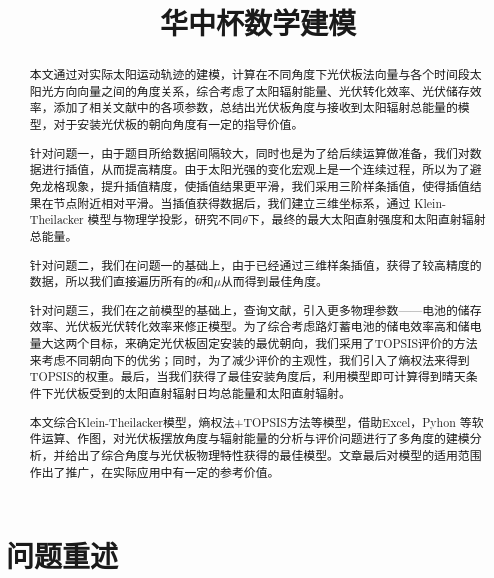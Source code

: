 \documentclass[withoutpreface,bwprint]{cumcmthesis} %
\title{华中杯数学建模}
\begin{document}
	
 \maketitle


 \begin{abstract}

本文通过对实际太阳运动轨迹的建模，计算在不同角度下光伏板法向量与各个时间段太阳光方向向量之间的角度关系，综合考虑了太阳辐射能量、光伏转化效率、光伏储存效率，添加了相关文献中的各项参数，总结出光伏板角度与接收到太阳辐射总能量的模型，对于安装光伏板的朝向角度有一定的指导价值。

针对问题一，由于题目所给数据间隔较大，同时也是为了给后续运算做准备，我们对数据进行插值，从而提高精度。由于太阳光强的变化宏观上是一个连续过程，所以为了避免龙格现象，提升插值精度，使插值结果更平滑，我们采用三阶样条插值，使得插值结果在节点附近相对平滑。当插值获得数据后，我们建立三维坐标系，通过 Klein-Theilacker 模型与物理学投影，研究不同$\theta$下，最终的最大太阳直射强度和太阳直射辐射总能量。

针对问题二，我们在问题一的基础上，由于已经通过三维样条插值，获得了较高精度的数据，所以我们直接遍历所有的$\theta$和$\mu$从而得到最佳角度。

针对问题三，我们在之前模型的基础上，查询文献，引入更多物理参数——电池的储存效率、光伏板光伏转化效率来修正模型。为了综合考虑路灯蓄电池的储电效率高和储电量大这两个目标，来确定光伏板固定安装的最优朝向，我们采用了TOPSIS评价的方法来考虑不同朝向下的优劣；同时，为了减少评价的主观性，我们引入了熵权法来得到TOPSIS的权重。最后，当我们获得了最佳安装角度后，利用模型即可计算得到晴天条件下光伏板受到的太阳直射辐射日均总能量和太阳直射辐射。

本文综合Klein-Theilacker模型，熵权法+TOPSIS方法等模型，借助Excel，Pyhon 等软件运算、作图，对光伏板摆放角度与辐射能量的分析与评价问题进行了多角度的建模分析，并给出了综合角度与光伏板物理特性获得的最佳模型。文章最后对模型的适用范围作出了推广，在实际应用中有一定的参考价值。


\end{abstract}



\tableofcontents

\newpage


\section{问题重述}
\end{document}
